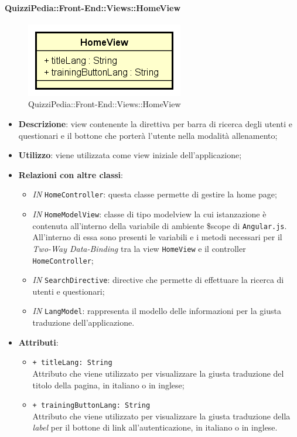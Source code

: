 \paragraph{QuizziPedia::Front-End::Views::HomeView}
\begin{figure} [ht]
	\centering
	\includegraphics[scale=0.80]{UML/Classi/Front-End/QuizziPedia_Front-end_Views_HomeView.png}
	\caption{QuizziPedia::Front-End::Views::HomeView}
\end{figure} \FloatBarrier
\begin{itemize}
	\item \textbf{Descrizione}: view contenente la direttiva per barra di ricerca degli utenti e questionari e il bottone che porterà l'utente nella modalità allenamento;
	\item \textbf{Utilizzo}: viene utilizzata come view iniziale dell'applicazione;
	\item \textbf{Relazioni con altre classi}:
	\begin{itemize}
		\item \textit{IN} \texttt{HomeController}: questa classe permette di gestire la home page;
		\item \textit{IN} \texttt{HomeModelView}: classe di tipo modelview la cui istanzazione è contenuta all'interno della variabile di ambiente \$scope di \texttt{Angular.js}. All'interno di essa sono presenti le variabili e i metodi necessari per il \textit{Two-Way Data-Binding} tra la view \texttt{HomeView} e il controller \texttt{HomeController};
		\item \textit{IN} \texttt{SearchDirective}: directive che permette di effettuare la ricerca di utenti e questionari;
		\item \textit{IN} \texttt{LangModel}: rappresenta il modello delle informazioni per la giusta traduzione dell'applicazione.
	\end{itemize}
	\item \textbf{Attributi}:
	\begin{itemize}
		\item \texttt{+ titleLang: String} \\ Attributo che viene utilizzato per visualizzare la giusta traduzione del titolo della pagina, in italiano o in inglese;
		\item \texttt{+ trainingButtonLang: String} \\ Attributo che viene utilizzato per visualizzare la giusta traduzione della \textit{label} per il bottone di link all'autenticazione, in italiano o in inglese.
	\end{itemize}
\end{itemize}
	
